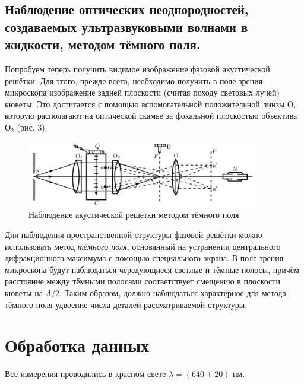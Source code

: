 \documentclass[a4paper,12pt]{article}
\begin{document}
\subsection{Наблюдение оптических неоднородностей, создаваемых ультразвуковыми волнами в жидкости, методом тёмного поля.}
Попробуем теперь получить видимое изображение фазовой акустической решётки. Для этого, прежде всего, необходимо получить в поле зрения микроскопа изображение задней плоскости (считая походу световых лучей) кюветы. Это достигается с помощью вспомогательной положительной линзы $О$, которую располагают на оптической скамье за фокальной плоскостью объектива $О_2$ (рис. 3).
\begin{figure}[H]\label{fig: Exp setup 2}
    \centering
    \includegraphics[width = 0.9\textwidth]{Exp setup 2.png}
    \caption{Наблюдение акустической решётки методом тёмного поля}
\end{figure}

Для наблюдения пространственной структуры фазовой решётки можно использовать метод \textit{тёмного поля}, основанный на устранении центрального дифракционного максимума с помощью специального экрана. В поле зрения микроскопа будут наблюдаться чередующиеся светлые и тёмные полосы, причём расстояние между тёмными полосами соответствует смещению в плоскости кюветы на $\Lambda / 2$. Таким образом, должно наблюдаться характерное для метода тёмного поля удвоение числа деталей рассматриваемой структуры.

\section{Обработка данных}
Все измерения проводились в красном свете $\lambda = (640 \pm 20)$ нм.
\end{document}
